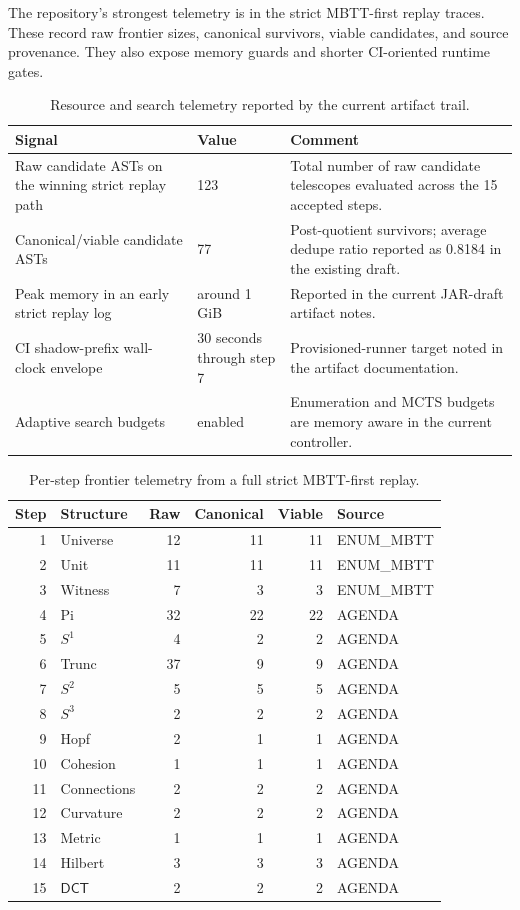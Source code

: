 \documentclass[pdflatex,sn-mathphys,Numbered]{sn-jnl}
\theoremstyle{thmstyleone}
\theoremstyle{thmstylethree}
\theoremstyle{thmstyletwo}
\newcommand{\DCT}{\ensuremath{\mathsf{DCT}}}
\newcommand{\Sone}{S^1}
\newcommand{\Stwo}{S^2}
\newcommand{\Sthree}{S^3}
\begin{document}
The repository's strongest telemetry is in the strict MBTT-first replay traces. These record raw frontier sizes, canonical survivors, viable candidates, and source provenance. They also expose memory guards and shorter CI-oriented runtime gates.

\begin{table}[t]
\centering
\caption{Resource and search telemetry reported by the current artifact trail.}
\label{tab:resources}
\footnotesize
\begin{tabular}{@{}p{3.7cm}p{2.1cm}p{4.6cm}@{}}
\toprule
Signal & Value & Comment \\
\midrule
Raw candidate ASTs on the winning strict replay path & 123 & Total number of raw candidate telescopes evaluated across the 15 accepted steps. \\
Canonical/viable candidate ASTs & 77 & Post-quotient survivors; average dedupe ratio reported as 0.8184 in the existing draft. \\
Peak memory in an early strict replay log & around 1\,GiB & Reported in the current JAR-draft artifact notes. \\
CI shadow-prefix wall-clock envelope & 30 seconds through step 7 & Provisioned-runner target noted in the artifact documentation. \\
Adaptive search budgets & enabled & Enumeration and MCTS budgets are memory aware in the current controller. \\
\bottomrule
\end{tabular}
\end{table}

\begin{table}[p]
\centering
\caption{Per-step frontier telemetry from a full strict MBTT-first replay.}
\label{tab:telemetry}
\footnotesize
\begin{tabular}{@{}r l r r r l@{}}
\toprule
Step & Structure & Raw & Canonical & Viable & Source \\
\midrule
1 & Universe & 12 & 11 & 11 & ENUM\_MBTT \\
2 & Unit & 11 & 11 & 11 & ENUM\_MBTT \\
3 & Witness & 7 & 3 & 3 & ENUM\_MBTT \\
4 & Pi & 32 & 22 & 22 & AGENDA \\
5 & $\Sone$ & 4 & 2 & 2 & AGENDA \\
6 & Trunc & 37 & 9 & 9 & AGENDA \\
7 & $\Stwo$ & 5 & 5 & 5 & AGENDA \\
8 & $\Sthree$ & 2 & 2 & 2 & AGENDA \\
9 & Hopf & 2 & 1 & 1 & AGENDA \\
10 & Cohesion & 1 & 1 & 1 & AGENDA \\
11 & Connections & 2 & 2 & 2 & AGENDA \\
12 & Curvature & 2 & 2 & 2 & AGENDA \\
13 & Metric & 1 & 1 & 1 & AGENDA \\
14 & Hilbert & 3 & 3 & 3 & AGENDA \\
15 & \DCT{} & 2 & 2 & 2 & AGENDA \\
\bottomrule
\end{tabular}
\end{table}
\end{document}
